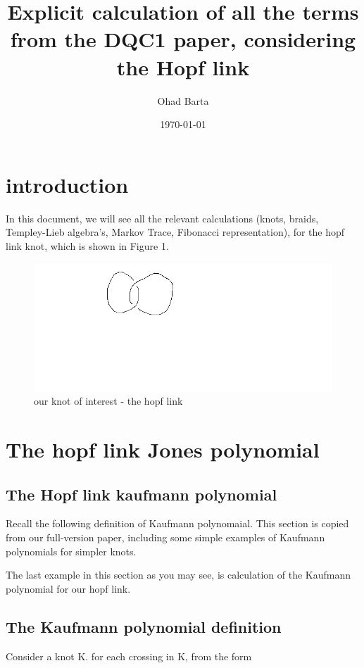 \documentclass{article}
\begin{document}
\title{Explicit calculation of all the terms from the DQC1 paper, considering the Hopf link} 
\author{Ohad Barta}
\date{\today} 

\titlepage
\tableofcontents









\section{introduction}
In this document, we will see all the relevant calculations (knots, braids, Templey-Lieb algebra's, Markov Trace, Fibonacci representation), for the hopf link knot, which is shown in Figure 1.

\begin{figure}
\includegraphics[scale=1]{raw_hopf_link} 
\caption{our knot of interest - the hopf link}
\end{figure}

\section{The hopf link Jones polynomial}

\subsection {The Hopf link kaufmann polynomial}
Recall the following definition of Kaufmann polynomaial. This section is copied from our full-version paper, including some simple examples of Kaufmann polynomials for simpler knots.

The last example in this section as you may see, is calculation of the Kaufmann polynomial for our hopf link.

\subsection{The Kaufmann polynomial definition}
Consider a knot K. for each crossing in K, from the form 
\begin{center}
\end{center} 
\end{document}

